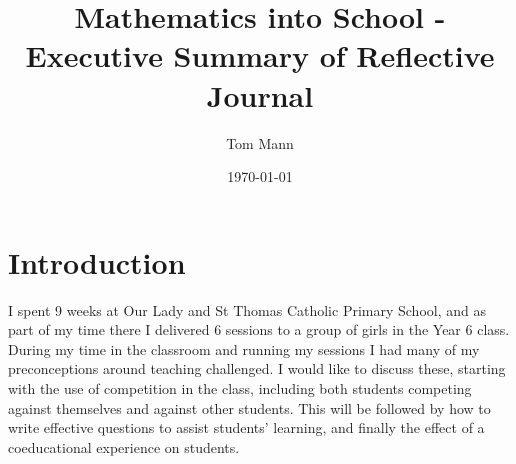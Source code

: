\documentclass[11pt, a4paper, notitlepage]{article}
\title{Mathematics into School - Executive Summary of Reflective Journal}
\author{Tom Mann}
\date{\today}
\begin{document}
\maketitle

\section*{Introduction}
I spent 9 weeks at Our Lady and St Thomas Catholic Primary School, and as part of my time there I delivered 6 sessions to a group of girls in the Year 6 class. During my time in the classroom and running my sessions I had many of my preconceptions around teaching challenged. I would like to discuss these, starting with the use of competition in the class, including both students competing against themselves and against other students. This will be followed by how to write effective questions to assist students' learning, and finally the effect of a coeducational experience on students.
\end{document}
